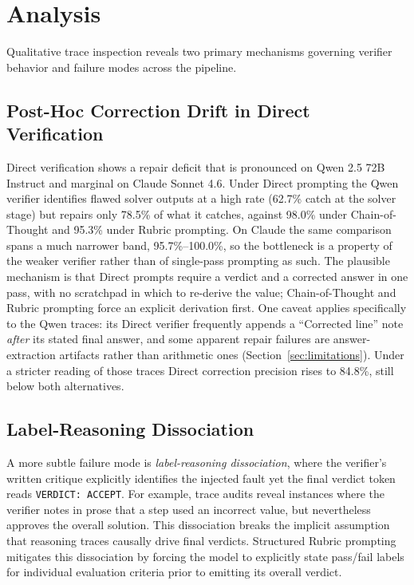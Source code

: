 \documentclass[11pt]{article}
\begin{document}
\section{Analysis}

Qualitative trace inspection reveals two primary mechanisms governing verifier behavior and failure modes across the pipeline.

\subsection*{Post-Hoc Correction Drift in Direct Verification}
Direct verification shows a repair deficit that is pronounced on Qwen 2.5 72B Instruct and marginal on Claude Sonnet 4.6. Under Direct prompting the Qwen verifier identifies flawed solver outputs at a high rate (62.7\% catch at the solver stage) but repairs only 78.5\% of what it catches, against 98.0\% under Chain-of-Thought and 95.3\% under Rubric prompting. On Claude the same comparison spans a much narrower band, 95.7\%--100.0\%, so the bottleneck is a property of the weaker verifier rather than of single-pass prompting as such. The plausible mechanism is that Direct prompts require a verdict and a corrected answer in one pass, with no scratchpad in which to re-derive the value; Chain-of-Thought and Rubric prompting force an explicit derivation first. One caveat applies specifically to the Qwen traces: its Direct verifier frequently appends a ``Corrected line'' note \emph{after} its stated final answer, and some apparent repair failures are answer-extraction artifacts rather than arithmetic ones (Section~\ref{sec:limitations}). Under a stricter reading of those traces Direct correction precision rises to 84.8\%, still below both alternatives.

\subsection*{Label-Reasoning Dissociation}
A more subtle failure mode is \emph{label-reasoning dissociation}, where the verifier's written critique explicitly identifies the injected fault yet the final verdict token reads \texttt{VERDICT: ACCEPT}. For example, trace audits reveal instances where the verifier notes in prose that a step used an incorrect value, but nevertheless approves the overall solution. This dissociation breaks the implicit assumption that reasoning traces causally drive final verdicts. Structured Rubric prompting mitigates this dissociation by forcing the model to explicitly state pass/fail labels for individual evaluation criteria prior to emitting its overall verdict.
\end{document}
